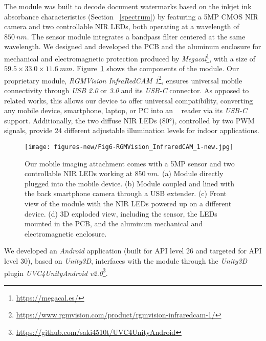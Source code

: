The module was built to decode document watermarks based on the inkjet ink absorbance characteristics (Section~
\ref{spectrum}) by featuring a 5MP CMOS NIR camera and two controllable NIR LEDs, both operating at a wavelength of $850~nm$. The sensor module integrates a bandpass filter centered at the same wavelength. We designed and developed the PCB and the aluminum enclosure for mechanical and electromagnetic protection produced by \textit{Megacal}\footnote{\url{https://megacal.es/}}, with a size of $59.5\times33.0\times11.6~mm$. 
Figure~\ref{fig:RGMCameraModule} shows the components of the module.
Our proprietary module, \textit{RGMVision InfraRedCAM 1}\footnote{\url{https://www.rgmvision.com/product/rgmvision-infraredcam-1/}}, ensures universal mobile connectivity through \textit{USB 2.0} or \textit{3.0} and its \textit{USB-C} connector. %
As opposed to related works, this allows our device to offer universal compatibility, converting any mobile device, smartphone, laptop, or PC into an \systemName~ reader via its \textit{USB-C} support. Additionally, the two diffuse NIR LEDs (80°), controlled by two PWM signals, provide 24 different adjustable illumination levels for indoor applications.


\begin{figure}[]
  \centering
  \texttt{[image: figures-new/Fig6-RGMVision\_InfraredCAM\_1-new.jpg]}
  \caption{%
  Our mobile imaging attachment comes with a 5MP sensor and two controllable NIR LEDs working at $850~nm$. (a) Module directly plugged into the mobile device. (b) Module coupled and lined with the back smartphone camera through a USB extender. (c) Front view of the module with the NIR LEDs powered up on a different device. (d) 3D exploded view, including the sensor, the LEDs mounted in the PCB, and the aluminum mechanical and electromagnetic enclosure.}
  \label{fig:RGMCameraModule}
\end{figure}



We developed an \textit{Android} application (built for API level 26 and targeted for API level 30), based on \textit{Unity3D}, interfaces with the module through the \textit{Unity3D} plugin \textit{UVC4UnityAndroid v2.0}\footnote{\url{https://github.com/saki4510t/UVC4UnityAndroid}}.




